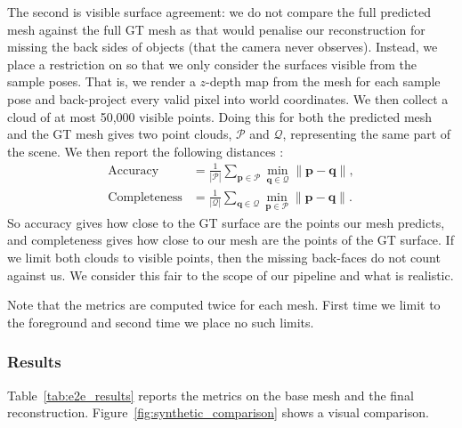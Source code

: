 \documentclass[10pt,twocolumn]{article}
\begin{document}
The second is visible surface agreement: we do not compare the full predicted mesh against the full GT mesh as that would penalise our reconstruction for missing the back sides of objects (that the camera never observes). Instead, we place a restriction on so that we only consider the surfaces visible from the sample poses.
That is, we render a $z$-depth map from the mesh for each sample pose and back-project every valid pixel into world coordinates. We then collect a cloud of at most 50,000 visible points. Doing this for both the predicted mesh and the GT mesh gives two point clouds, $\mathcal{P}$ and $\mathcal{Q}$, representing the same part of the scene.
We then report the following distances \cite{seitz2006}:
\begin{align}
    \text{Accuracy} &= \frac{1}{|\mathcal{P}|}\sum_{\mathbf{p}\in\mathcal{P}} \min_{\mathbf{q}\in\mathcal{Q}} \|\mathbf{p}-\mathbf{q}\|, \\
    \text{Completeness} &= \frac{1}{|\mathcal{Q}|}\sum_{\mathbf{q}\in\mathcal{Q}} \min_{\mathbf{p}\in\mathcal{P}} \|\mathbf{p}-\mathbf{q}\|.
\end{align}
So accuracy gives how close to the GT surface are the points our mesh predicts, and completeness gives how close to our mesh are the points of the GT surface.
If we limit both clouds to visible points, then the missing back-faces do not count against us. We consider this fair to the scope of our pipeline and what is realistic.

Note that the metrics are computed twice for each mesh. First time we limit to the foreground and second time we place no such limits.

\subsubsection{Results}

Table~\ref{tab:e2e_results} reports the metrics on the base mesh and the final reconstruction. Figure~\ref{fig:synthetic_comparison} shows a visual comparison.
\end{document}
